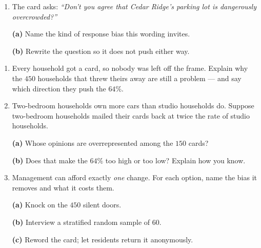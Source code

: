 \documentclass[10pt]{article}
\begin{document}
\begin{tcolorbox}[colback=white, colframe=black!40, breakable,
    title=\textbf{Tier A --- Approaching Proficiency},
    fonttitle=\bfseries, arc=2mm, left=3mm, right=3mm, top=2mm, bottom=2mm]
\begin{enumerate}[leftmargin=1.6em, itemsep=5pt, topsep=3pt]
        \textbf{(b)} Twice as many cards, same answer, still $24$ points above
        the truth. Explain why the extra cards did not help.

  \item The card asks: \emph{``Don't you agree that Cedar Ridge's parking lot is
        dangerously overcrowded?''}

        \textbf{(a)} Name the kind of response bias this wording invites.
        \blank{4.5cm}

        \textbf{(b)} Rewrite the question so it does not push either way.
\end{enumerate}
\end{tcolorbox}

\vspace{0.06in}

\boxguard
\begin{tcolorbox}[colback=white, colframe=black!40, breakable,
    title=\textbf{Tier E --- Extension},
    fonttitle=\bfseries, arc=2mm, left=3mm, right=3mm, top=2mm, bottom=2mm]
\small
\begin{enumerate}[leftmargin=1.6em, itemsep=5pt, topsep=3pt]

  \item Every household got a card, so nobody was left off the frame. Explain why
        the $450$ households that threw theirs away are still a problem --- and
        say which direction they push the $64\%$.

  \item Two-bedroom households own more cars than studio households do. Suppose
        two-bedroom households mailed their cards back at twice the rate of
        studio households.

        \textbf{(a)} Whose opinions are overrepresented among the $150$ cards?
        \writeline

        \textbf{(b)} Does that make the $64\%$ too high or too low? Explain how
        you know.

  \item Management can afford exactly \emph{one} change. For each option, name
        the bias it removes and what it costs them.

        \textbf{(a)} Knock on the $450$ silent doors.
        \writeline

        \textbf{(b)} Interview a stratified random sample of $60$.
        \writeline

        \textbf{(c)} Reword the card; let residents return it anonymously.
        \writeline
\end{enumerate}
\end{tcolorbox}
\end{document}
